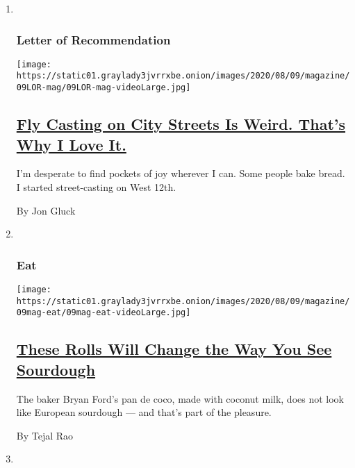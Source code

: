 \begin{enumerate}
\def\labelenumi{\arabic{enumi}.}
\item ~
  \hypertarget{letter-of-recommendation}{%
  \subsubsection{Letter of
  Recommendation}\label{letter-of-recommendation}}

  \texttt{[image: https://static01.graylady3jvrrxbe.onion/images/2020/08/09/magazine/09LOR-mag/09LOR-mag-videoLarge.jpg]}

  \hypertarget{fly-casting-on-city-streets-is-weird-thats-why-i-love-it}{%
  \subsection{\texorpdfstring{\href{/2020/08/05/magazine/fly-casting-on-city-streets-is-weird-thats-why-i-love-it.html}{Fly
  Casting on City Streets Is Weird. That's Why I Love
  It.}}{Fly Casting on City Streets Is Weird. That's Why I Love It.}}\label{fly-casting-on-city-streets-is-weird-thats-why-i-love-it}}

  I'm desperate to find pockets of joy wherever I can. Some people bake
  bread. I started street-casting on West 12th.

  By Jon Gluck
\item ~
  \hypertarget{eat}{%
  \subsubsection{Eat}\label{eat}}

  \texttt{[image: https://static01.graylady3jvrrxbe.onion/images/2020/08/09/magazine/09mag-eat/09mag-eat-videoLarge.jpg]}

  \hypertarget{these-rolls-will-change-the-way-you-see-sourdough}{%
  \subsection{\texorpdfstring{\href{/2020/08/05/magazine/pan-de-coco-recipe-bryan-ford.html}{These
  Rolls Will Change the Way You See
  Sourdough}}{These Rolls Will Change the Way You See Sourdough}}\label{these-rolls-will-change-the-way-you-see-sourdough}}

  The baker Bryan Ford's pan de coco, made with coconut milk, does not
  look like European sourdough --- and that's part of the pleasure.

  By Tejal Rao
\item ~
  \hypertarget{the-ethicist}{%
}
\end{enumerate}
